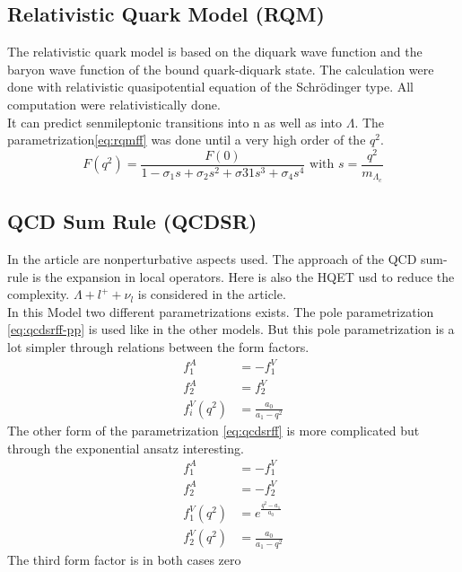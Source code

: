 \subsection{Relativistic Quark Model (RQM)}
The relativistic quark model{\cite{RQM}} is based on the diquark wave function 
and the baryon wave function of the bound quark-diquark state. The calculation 
were done with relativistic quasipotential equation of the Schr\"{o}dinger type.
All computation were relativistically done.\\
It can predict senmileptonic transitions into n as well as into \(\Lambda\).
The parametrization{\eqref{eq:rqmff}} was done until a very high order of the 
\(q^2\).
\begin{equation}
  F(q^2) = \frac{F(0)}{1 - \sigma_1 s + \sigma_2 s^2 + \sigma31 s^3 + \sigma_4 s^4} 
  \text{ with } s = \frac{q^2}{m_{\Lambda_c}} \label{eq:rqmff}
\end{equation}

\subsection{QCD Sum Rule (QCDSR)}
In the article {\cite{QCDSR}} are nonperturbative aspects used. The approach of 
the QCD sum-rule is the expansion in local operators. Here is also the HQET usd 
to reduce the complexity. \(\Lambda + l^+ + \nu_l\) is considered in the article.\\
In this Model two different parametrizations exists. The pole parametrization 
{\eqref{eq:qcdsrff-pp}} is used like in the other models. But this pole 
parametrization is a lot simpler through relations between the form factors.
\begin{align}
  f^A_1 & = - f^V_1 \nonumber \\
  f^A_2 & = f^V_2 \nonumber \\
  f^V_i(q^2) & = \frac{a_0}{a_1 - q^2} \label{eq:qcdsrff-pp}
\end{align} 
The other form of the parametrization  {\eqref{eq:qcdsrff}} is more complicated 
but through the exponential ansatz interesting.
\begin{align}
  f^A_1 & = - f^V_1 \nonumber \\
  f^A_2 & = - f^V_2 \nonumber \\
  f^V_1(q^2) & = e^{\frac{q^2 - a_1}{a_0}} \nonumber \\
  f^V_2(q^2) & = \frac{a_0}{a_1 - q^2} \label{eq:qcdsrff}
\end{align} 
The third form factor is in both cases zero

